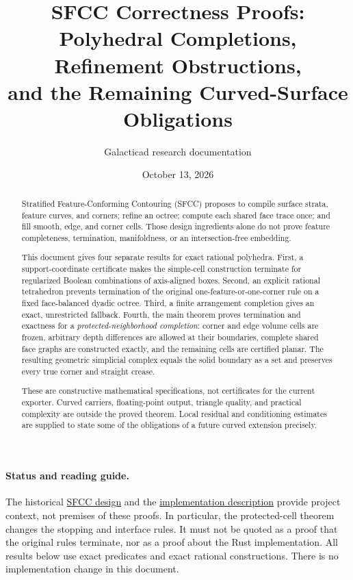 \documentclass[11pt]{article}
\title{SFCC Correctness Proofs:\\
  Polyhedral Completions, Refinement Obstructions,\\
  and the Remaining Curved-Surface Obligations}
\author{Galacticad research documentation}
\date{October 13, 2026}
\theoremstyle{definition}
\theoremstyle{remark}
\begin{document}
\maketitle

\begin{abstract}
Stratified Feature-Conforming Contouring (SFCC) proposes to compile surface
strata, feature curves, and corners; refine an octree; compute each shared face
trace once; and fill smooth, edge, and corner cells. Those design ingredients
alone do not prove feature completeness, termination, manifoldness, or an
intersection-free embedding.

This document gives four separate results for exact rational polyhedra.
First, a support-coordinate certificate makes the simple-cell construction
terminate for regularized Boolean combinations of axis-aligned boxes.
Second, an explicit rational tetrahedron prevents termination of the original
one-feature-or-one-corner rule on a fixed face-balanced dyadic octree.
Third, a finite arrangement completion gives an exact, unrestricted fallback.
Fourth, the main theorem proves termination and exactness for a
\emph{protected-neighborhood completion}: corner and edge volume cells are
frozen, arbitrary depth differences are allowed at their boundaries, complete
shared face graphs are constructed exactly, and the remaining cells are
certified planar. The resulting geometric simplicial complex equals the solid
boundary as a set and preserves every true corner and straight crease.

These are constructive mathematical specifications, not certificates for the
current exporter. Curved carriers, floating-point output, triangle quality, and
practical complexity are outside the proved theorem. Local residual and
conditioning estimates are supplied to state some of the obligations of a
future curved extension precisely.
\end{abstract}

\paragraph{Status and reading guide.}
The historical
\href{http://md.localhost/Users/matt/gcad/galacticad/docs/research/sfcc-algorithm-design.md}{SFCC design}
and the
\href{http://md.localhost/Users/matt/gcad/galacticad/docs/sfcc-meshing-algorithm.md}{implementation description}
provide project context, not premises of these proofs. In particular, the
protected-cell theorem changes the stopping and interface rules. It must not be
quoted as a proof that the original rules terminate, nor as a proof about the
Rust implementation. All results below use exact predicates and exact rational
constructions. There is no implementation change in this document.
\end{document}
